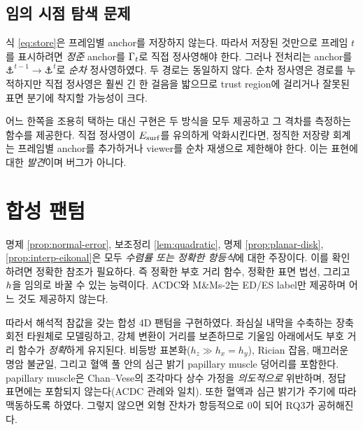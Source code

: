 \subsection{임의 시점 탐색 문제}
\label{sec:seek-problem}

식 \eqref{eq:store}은 프레임별 anchor를 저장하지 않는다. 따라서 저장된 것만으로
프레임 $t$를 표시하려면 \emph{정준} anchor를 $\Gamma_t$로 직접 정사영해야 한다. 그러나
전처리는 anchor를 $\anchor^{t-1}\to\anchor^t$로 \emph{순차} 정사영하였다. 두 경로는
동일하지 않다. 순차 정사영은 경로를 누적하지만 직접 정사영은 훨씬 긴 한 걸음을 밟으므로
trust region에 걸리거나 잘못된 표면 분기에 착지할 가능성이 크다.

어느 한쪽을 조용히 택하는 대신 구현은 두 방식을 모두 제공하고 그 격차를 측정하는
함수를 제공한다. 직접 정사영이 $E_{\mathrm{surf}}$를 유의하게 악화시킨다면, 정직한 저장량 회계는
프레임별 anchor를 추가하거나 viewer를 순차 재생으로 제한해야 한다. 이는 표현에 대한
\emph{발견}이며 버그가 아니다.


\section{합성 팬텀}
\label{sec:phantom}

명제 \ref{prop:normal-error}, 보조정리 \ref{lem:quadratic}, 명제
\ref{prop:planar-disk}, \ref{prop:interp-eikonal}은 모두 \emph{수렴률 또는 정확한 항등식}에
대한 주장이다. 이를 확인하려면 정확한 참조가 필요하다. 즉 정확한 부호 거리 함수,
정확한 표면 법선, 그리고 $h$을 임의로 바꿀 수 있는 능력이다. ACDC와 M\&Ms-2는
ED/ES label만 제공하며 어느 것도 제공하지 않는다.

따라서 해석적 참값을 갖는 합성 4D 팬텀을 구현하였다. 좌심실 내막을 수축하는 장축
회전 타원체로 모델링하고, 강체 변환이 거리를 보존하므로 기울임 아래에서도 부호 거리
함수가 \emph{정확}하게 유지된다. 비등방 표본화($h_z\gg h_x=h_y$), Rician 잡음, 매끄러운
명암 불균일, 그리고 혈액 풀 안의 심근 밝기 papillary muscle 덩어리를 포함한다.
papillary muscle은 Chan--Vese의 조각마다 상수 가정을 \emph{의도적으로} 위반하며, 정답
표면에는 포함되지 않는다(ACDC 관례와 일치). 또한 혈액과 심근 밝기가 주기에 따라
맥동하도록 하였다. 그렇지 않으면 외형 잔차가 항등적으로 0이 되어 RQ3가 공허해진다.


